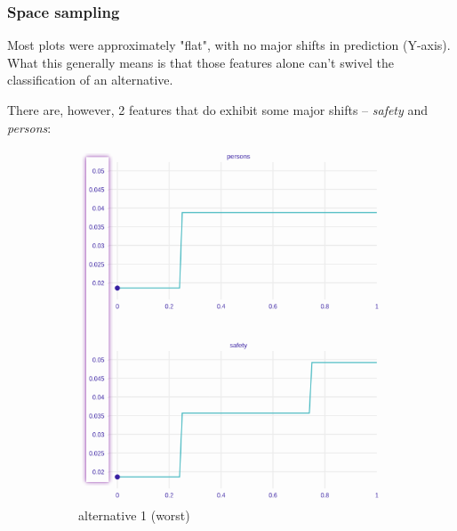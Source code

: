 \documentclass[../main.tex]{subfiles}
\begin{document}
\subsubsection{Space sampling}
Most plots were approximately "flat", with no major shifts in prediction
(Y-axis). What this generally means is that those features alone can't swivel
the classification of an alternative.

There are, however, 2 features that do exhibit some major shifts --
\emph{safety} and \emph{persons}:
\begin{figure}[H]
	\centering
	\begin{subfigure}[b]{0.32\linewidth}
		\includegraphics[width=\linewidth]{../img/xgb-cetpar-worst.png}
		\caption{alternative 1 (worst)}
		\label{fig:xgb-3alt1-cetpar}
	\end{subfigure}
	\begin{subfigure}[b]{0.32\linewidth}

\end{subfigure}
\end{figure}
\end{document}
